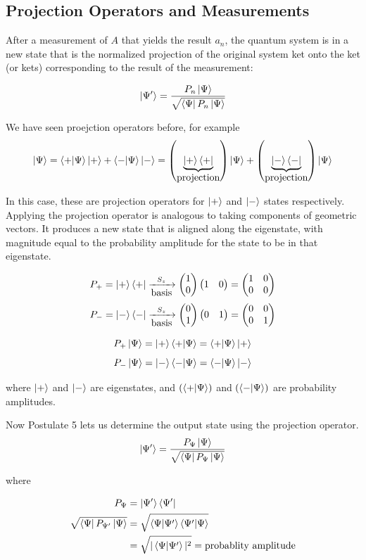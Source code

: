 \documentclass[english, 11pt]{article}
\begin{document}
    \subsection{Projection Operators and Measurements}

      \begin{defn}[Postulate 5]\label{postulate_5}
        After a measurement of $A$ that yields the result $a_n$, the quantum system is in a new state that is the normalized projection of the original system ket onto the ket (or kets) corresponding to the result of the measurement:

        \[ \left|\Psi'\right\rangle = \frac{P_n\left|\Psi\right\rangle}{\sqrt{\left\langle\Psi\right|P_n\left|\Psi\right\rangle}} \]
      \end{defn}

      We have seen proejction operators before, for example
      \[ \ket{\Psi} = \braket{+}{\Psi}\kp + \braket{-}{\Psi}\ket{-} = \left( \underbrace{\kp\bp}_{\mbox{projection}} \right)\ket{\Psi} + \left( \underbrace{\km\bm}_{\mbox{projection}}  \right)\ket{\Psi}\]

      In this case, these are projection operators for $\left|+\right\rangle$ and $\left|-\right\rangle$ states respectively. Applying the projection operator is analogous to taking components of geometric vectors. It produces a new state that is aligned along the eigenstate, with magnitude equal to the probability amplitude for the state to be in that eigenstate.

      \[ P_+ = \left|+\right\rangle\left\langle+\right| \xrightarrow[\mbox{basis}]{S_z} \left(\begin{matrix}1 \\0\end{matrix}\right)\left(\begin{matrix}1 & 0\end{matrix}\right) = \left(\begin{matrix}1 & 0 \\ 0 & 0\end{matrix}\right) \]
      \[ P_- = \left|-\right\rangle\left\langle-\right| \xrightarrow[\mbox{basis}]{S_z} \left(\begin{matrix}0 \\1\end{matrix}\right)\left(\begin{matrix}0 & 1\end{matrix}\right) = \left(\begin{matrix}0 & 0 \\ 0 & 1\end{matrix}\right) \]

      \[ P_+\ket{\Psi} = \kp\braket{+}{\Psi} = \braket{+}{\Psi} \kp \]
      \[ P_-\ket{\Psi} = \km\braket{-}{\Psi} = \braket{-}{\Psi} \km \]

      where $\left|+\right\rangle$ and $\left|-\right\rangle$ are eigenstates, and $\left( \braket{+}{\Psi} \right)$ and $\left( \braket{-}{\Psi} \right)$ are probability amplitudes.\
      \newline

      Now Postulate 5 lets us determine the output state using the projection operator.
      \[ \left|\Psi'\right\rangle = \frac{P_\Psi\left|\Psi\right\rangle}{\sqrt{\left\langle\Psi\right|P_\Psi\left|\Psi\right\rangle}} \]

      where

      \begin{align*}
        P_\Psi & = \ket{\Psi'}\bra{\Psi'} \\
        \sqrt{\bra{\Psi}P_{\Psi'}\ket{\Psi}} & = \sqrt{\braket{\Psi}{\Psi'}\braket{\Psi'}{\Psi}} \\
        & = \sqrt{|\braket{\Psi}{\Psi'}|^2} = \mbox{probablity amplitude}
      \end{align*}
\end{document}
